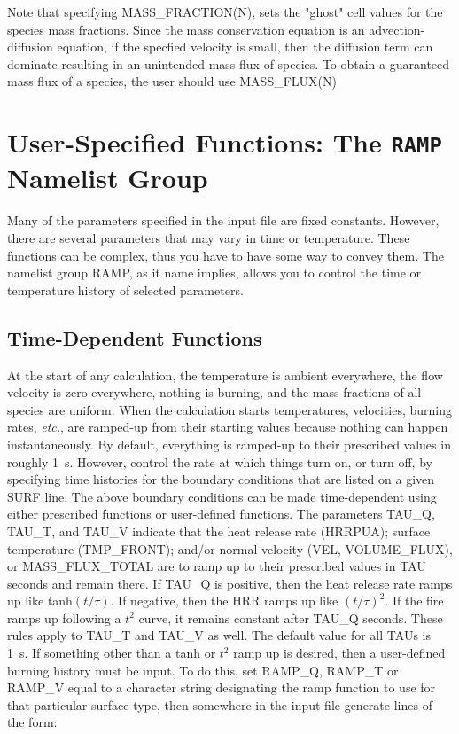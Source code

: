 \documentclass[11pt]{book}
\begin{document}
\begin{warning}
\noindent
Note that specifying {\ct MASS\_FRACTION(N)}, sets the "ghost" cell values for the species
mass fractions.  Since the mass conservation equation is an advection-diffusion equation,
if the specfied velocity is small, then the diffusion term can dominate resulting in an unintended
mass flux of species.  To obtain a guaranteed mass flux of a species, the user should use {\ct MASS\_FLUX(N)}
\end{warning}



\section{User-Specified Functions: The \texorpdfstring{{\tt RAMP}}{RAMP} Namelist Group}
\label{info:RAMP}

Many of the parameters specified in the input file are fixed constants. However, there are several parameters that may vary in
time or temperature. These functions can be complex, thus you have to have some way to convey them. The namelist group
{\ct RAMP}, as it name implies, allows you to control the time or temperature history of selected parameters.

\subsection{Time-Dependent Functions}

At the start of any calculation, the temperature is
ambient everywhere, the flow velocity is zero everywhere, nothing is burning, and
the mass fractions of all species are uniform.
When the calculation starts temperatures, velocities, burning rates,
{\em etc.}, are ramped-up from their starting values because nothing
can happen instantaneously. By default, everything is ramped-up to their
prescribed values in roughly 1~s. However, control the
rate at which things turn on, or turn off, by specifying time histories
for the boundary conditions that are listed on a given {\ct SURF} line.
The above boundary conditions can be made time-dependent using either
prescribed functions or user-defined functions.
The parameters {\ct TAU\_Q}, {\ct TAU\_T}, and {\ct TAU\_V}
indicate that the heat release rate ({\ct HRRPUA}); surface temperature ({\ct TMP\_FRONT});
and/or normal velocity ({\ct VEL}, {\ct VOLUME\_FLUX}), or {\ct MASS\_FLUX\_TOTAL} are to ramp up
to their prescribed values in {\ct TAU} seconds and remain there.
If {\ct TAU\_Q} is positive, then the heat release rate ramps up
like tanh$(t/\tau)$. If negative, then
the HRR ramps up like $(t/\tau)^2$. If the fire ramps up following
a $t^2$ curve, it remains constant after {\ct TAU\_Q} seconds.
These rules apply to {\ct TAU\_T} and {\ct TAU\_V} as well.
The default value for all {\ct TAU}s is 1~s.
If something other than a tanh or $t^2$ ramp up is desired,
then a user-defined burning history must be input. To do this, set
{\ct RAMP\_Q}, {\ct RAMP\_T} or {\ct RAMP\_V}
equal to a character string designating the ramp function to use for that
particular surface type, then somewhere in the input file generate lines
of the form:
\end{document}
